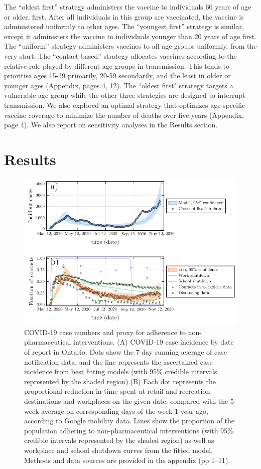The “oldest first” strategy administers the vaccine to individuals 60 years of age or older, first.  After all individuals in this group are vaccinated, the vaccine is administered uniformly to other ages. The “youngest first” strategy is similar, except it administers the vaccine to individuals younger than 20 years of age first.  The “uniform” strategy administers vaccines to all age groups uniformly, from the very start. The “contact-based” strategy allocates vaccines according to the relative role played by different age groups in transmission. This tends to prioritise ages 15-19 primarily, 20-59 secondarily, and the least in older or younger ages (Appendix, pages 4, 12).  The ``oldest first" strategy targets a vulnerable age group while the other three strategies are designed to interrupt transmission.  We also explored an optimal strategy that optimizes age-specific vaccine coverage to minimize the number of deaths over five years (Appendix, page 4). We also report on sensitivity analyses in the Results section. 


\section{Results} 

\begin{figure}
\includegraphics[width=\textwidth]{chapter_3/plot_model.pdf} 
\caption{COVID-19 case numbers and proxy for adherence to non-pharmaceutical interventions. (A) COVID-19 case incidence by date of report in Ontario. Dots show the 7-day running average of case notification data, and the line represents the ascertained case incidence from best fitting models (with 95\% credible intervals represented by the shaded region).(B) Each dot represents the proportional reduction in time spent at retail and recreation destinations and workplaces on the given date, compared with the 5-week average on corresponding days of the week 1 year ago, according to Google mobility data. Lines show the proportion of the population adhering to non-pharmaceutical interventions (with 95\% credible intervals represented by the shaded region) as well as workplace and school shutdown curves from the fitted model. Methods and data sources are provided in the appendix (pp 1–11).}
\label{fig1}
\end{figure}

